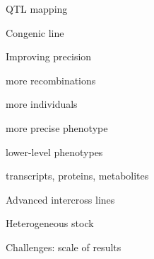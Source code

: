 \documentclass[aspectratio=169,12pt,t]{beamer}
\begin{document}
\begin{frame}[c]{QTL mapping}

\vspace{5mm}

\note{
}
\end{frame}



\begin{frame}[c]{Congenic line}


\note{
}
\end{frame}



\begin{frame}[c]{Improving precision}

  \vspace{-20mm}

  \bbi
\item more recombinations
\item more individuals
\item more precise phenotype
\item lower-level phenotypes
\bi
\item transcripts, proteins, metabolites
  \ei
  \ei

\note{
}
\end{frame}



\begin{frame}[c]{Advanced intercross lines}


\note{
}
\end{frame}




\begin{frame}[c]{Heterogeneous stock}

  \vspace{2mm}


\note{
}
\end{frame}



\begin{frame}[c]{Challenges: {\color{foreground} scale of results}}


\note{
}
\end{frame}
\end{document}
